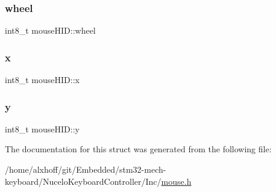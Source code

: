 \mbox{\label{structmouseHID_a1317617ea3f7c9d0231e852d0e15d2d2}} 
\subsubsection{\texorpdfstring{wheel}{wheel}}
{\footnotesize\ttfamily int8\+\_\+t mouse\+H\+I\+D\+::wheel}

\mbox{\label{structmouseHID_a0affa731298f3abbf6feebfd00387baf}} 
\subsubsection{\texorpdfstring{x}{x}}
{\footnotesize\ttfamily int8\+\_\+t mouse\+H\+I\+D\+::x}

\mbox{\label{structmouseHID_a184a9842c9e0aaecfb832459428d860d}} 
\subsubsection{\texorpdfstring{y}{y}}
{\footnotesize\ttfamily int8\+\_\+t mouse\+H\+I\+D\+::y}



The documentation for this struct was generated from the following file\+:\begin{DoxyCompactItemize}
\item 
/home/alxhoff/git/\+Embedded/stm32-\/mech-\/keyboard/\+Nucelo\+Keyboard\+Controller/\+Inc/\hyperlink{mouse_8h}{mouse.\+h}\end{DoxyCompactItemize}
